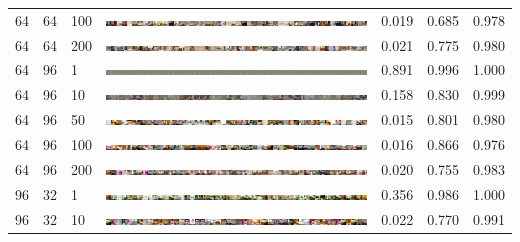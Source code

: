 \documentclass[a4paper]{article}
\begin{document}
\begin{table}[h!]
\begin{center}
{\begin{tabular}{lllcccc}
      64 & 64 & 100 & \includegraphics[width=\textwidth,trim={1536px 0 0 0},clip]{figures/bedrooms_g64_d64_ep100_generator.jpg}  & 0.019 & 0.685 & 0.978\\
      64 & 64 & 200 & \includegraphics[width=\textwidth,trim={1536px 0 0 0},clip]{figures/bedrooms_g64_d64_ep200_generator.jpg}  & 0.021 & 0.775 & 0.980\\
      \hline
      64 & 96 & 1   & \includegraphics[width=\textwidth,trim={1536px 0 0 0},clip]{figures/bedrooms_g64_d96_ep1_generator.jpg}    & 0.891 & 0.996 & 1.000\\
      64 & 96 & 10  & \includegraphics[width=\textwidth,trim={1536px 0 0 0},clip]{figures/bedrooms_g64_d96_ep10_generator.jpg}   & 0.158 & 0.830 & 0.999\\
      64 & 96 & 50  & \includegraphics[width=\textwidth,trim={1536px 0 0 0},clip]{figures/bedrooms_g64_d96_ep50_generator.jpg}   & 0.015 & 0.801 & 0.980\\
      64 & 96 & 100 & \includegraphics[width=\textwidth,trim={1536px 0 0 0},clip]{figures/bedrooms_g64_d96_ep100_generator.jpg}  & 0.016 & 0.866 & 0.976\\
      64 & 96 & 200 & \includegraphics[width=\textwidth,trim={1536px 0 0 0},clip]{figures/bedrooms_g64_d96_ep200_generator.jpg}  & 0.020 & 0.755 & 0.983\\
      \hline
      96 & 32 & 1   & \includegraphics[width=\textwidth,trim={1536px 0 0 0},clip]{figures/bedrooms_g96_d32_ep1_generator.jpg}    & 0.356 & 0.986 & 1.000\\
      96 & 32 & 10  & \includegraphics[width=\textwidth,trim={1536px 0 0 0},clip]{figures/bedrooms_g96_d32_ep10_generator.jpg}   & 0.022 & 0.770 & 0.991\\

\end{tabular}}
\end{center}
\end{table}
\end{document}
